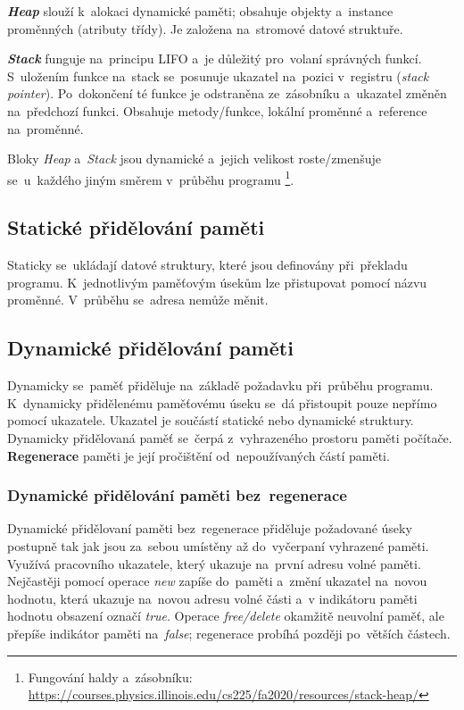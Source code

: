 \emph{\textbf{Heap}} slouží k~alokaci dynamické paměti; obsahuje objekty a~instance proměnných (atributy třídy). Je založena na~stromové datové struktuře.

\emph{\textbf{Stack}} funguje na~principu LIFO a~je důležitý pro~volaní správných funkcí. S~uložením funkce na~stack se~posunuje ukazatel na~pozici v~registru (\emph{stack pointer}). Po~dokončení té funkce je odstraněna ze~zásobníku a~ukazatel změněn na~předchozí funkci. Obsahuje metody/funkce, lokální proměnné a~reference na~proměnné.

Bloky \emph{Heap} a~\emph{Stack} jsou dynamické a~jejich velikost roste/zmenšuje se~u~každého jiným směrem v~průběhu programu%
\footnote{Fungování haldy a~zásobníku: \url{https://courses.physics.illinois.edu/cs225/fa2020/resources/stack-heap/}}.

\subsection{Statické přidělování paměti}

Staticky se~ukládají datové struktury, které jsou definovány při~překladu programu. K~jednotlivým paměťovým úsekům lze přistupovat pomocí názvu proměnné. V~průběhu se~adresa nemůže měnit.

\subsection{Dynamické přidělování paměti}

Dynamicky se~paměť přiděluje na~základě požadavku při~průběhu programu. K~dynamicky přidělenému paměťovému úseku se~dá přistoupit pouze nepřímo pomocí ukazatele. Ukazatel je součástí statické nebo dynamické struktury. Dynamicky přidělovaná paměť se~čerpá z~vyhrazeného prostoru paměti počítače. \textbf{Regenerace} paměti je její pročištění od~nepoužívaných částí paměti.

\subsubsection{Dynamické přidělování paměti bez~regenerace}

Dynamické přidělovaní paměti bez~regenerace přiděluje požadované úseky postupně tak jak jsou za~sebou umístěny až do~vyčerpaní vyhrazené paměti. Využívá pracovního ukazatele, který ukazuje na~první adresu volné paměti. Nejčastěji pomocí operace \emph{new} zapíše do~paměti a~změní ukazatel na~novou hodnotu, která ukazuje na~novou adresu volné části a~v indikátoru paměti hodnotu obsazení označí \emph{true}. Operace \emph{free/delete} okamžitě neuvolní paměť, ale přepíše indikátor paměti na~\emph{false}; regenerace probíhá později po~větších částech.

